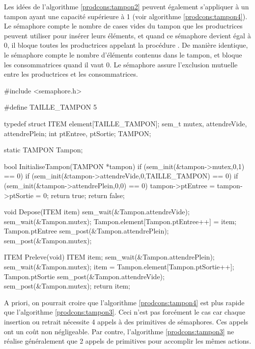 Les idées de l'algorithme \ref{prodcons:tampon2} peuvent également s'appliquer à un tampon ayant une capacité supérieure à 1 (voir algorithme \ref{prodcons:tampon4}).
Le sémaphore  compte le nombre de cases vides du tampon que les productrices peuvent utiliser pour insérer leurs éléments, et quand ce sémaphore devient égal à 0, il bloque toutes les productrices appelant la procédure .
De manière identique, le sémaphore  compte le nombre d'éléments contenus dans le tampon, et bloque les consommatrices quand il vaut 0. Le sémaphore  assure l'exclusion mutuelle entre les productrices et les consommatrices.

\begin{codeblock}[title=Algorithme de synchronisation pour un tampon,label=prodcons:tampon4]
#include <semaphore.h>

#define TAILLE_TAMPON 5

typedef struct {
  ITEM element[TAILLE_TAMPON];
  sem_t mutex, attendreVide, attendrePlein;
  int ptEntree, ptSortie;
} TAMPON;

static TAMPON Tampon;

bool InitialiseTampon(TAMPON *tampon) {
  if (sem_init(&tampon->mutex,0,1) == 0)
     if (sem_init(&tampon->attendreVide,0,TAILLE_TAMPON) == 0)
        if (sem_init(&tampon->attendrePlein,0,0) == 0) {
           tampon->ptEntree = tampon->ptSortie = 0;
           return true;
        }
  return false;
}

void Depose(ITEM item) {
  sem_wait(&Tampon.attendreVide);
  sem_wait(&Tampon.mutex);
  Tampon.element[Tampon.ptEntree++] = item;
  Tampon.ptEntree %
  sem_post(&Tampon.attendrePlein);
  sem_post(&Tampon.mutex);
}

ITEM Preleve(void) {
  ITEM item;
  sem_wait(&Tampon.attendrePlein);
  sem_wait(&Tampon.mutex);
  item = Tampon.element[Tampon.ptSortie++];
  Tampon.ptSortie %
  sem_post(&Tampon.attendreVide);
  sem_post(&Tampon.mutex);
  return item;
}
\end{codeblock}

A priori, on pourrait croire que l'algorithme \ref{prodcons:tampon4} est plus rapide que l'algorithme \ref{prodcons:tampon3}. Ceci n'est pas forcément le cas car chaque insertion ou retrait nécessite 4 appels à des primitives de sémaphores. Ces appels ont un coût non négligeable. Par contre, l'algorithme \ref{prodcons:tampon3} ne réalise généralement que 2 appels de primitives pour accomplir les mêmes actions.


